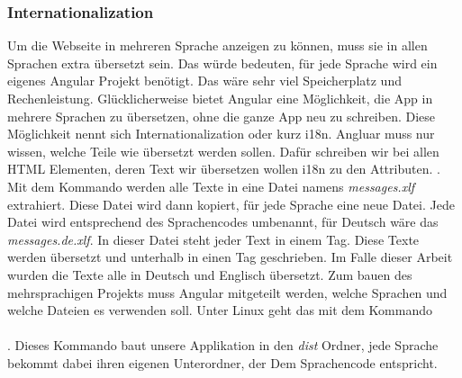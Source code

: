 \subsubsection{Internationalization}
\label{sec:ums-client-i18n}
Um die Webseite in mehreren Sprache anzeigen zu können, muss sie in allen Sprachen extra übersetzt sein. Das würde bedeuten, für jede Sprache wird ein eigenes Angular Projekt benötigt. Das wäre sehr viel Speicherplatz und Rechenleistung. Glücklicherweise bietet Angular eine Möglichkeit, die App in mehrere Sprachen zu übersetzen, ohne die ganze App neu zu schreiben. Diese Möglichkeit nennt sich Internationalization oder kurz i18n. Angluar muss nur wissen, welche Teile wie übersetzt werden sollen. Dafür schreiben wir bei allen \ac{HTML} Elementen, deren Text wir übersetzen wollen i18n zu den Attributen. . Mit dem Kommando  werden alle Texte in eine Datei namens \textit{messages.xlf} extrahiert. Diese Datei wird dann kopiert, für jede Sprache eine neue Datei. Jede Datei wird entsprechend des Sprachencodes umbenannt, für Deutsch wäre das \textit{messages.de.xlf}. In dieser Datei steht jeder Text in einem  Tag. Diese Texte werden übersetzt und unterhalb in einen  Tag geschrieben. Im Falle dieser Arbeit wurden die Texte alle in Deutsch und Englisch übersetzt. Zum bauen des mehrsprachigen Projekts muss Angular mitgeteilt werden, welche Sprachen und welche Dateien es verwenden soll. Unter Linux geht das mit dem Kommando \\\\. Dieses Kommando baut unsere Applikation in den \textit{dist} Ordner, jede Sprache bekommt dabei ihren eigenen Unterordner, der Dem Sprachencode entspricht.

